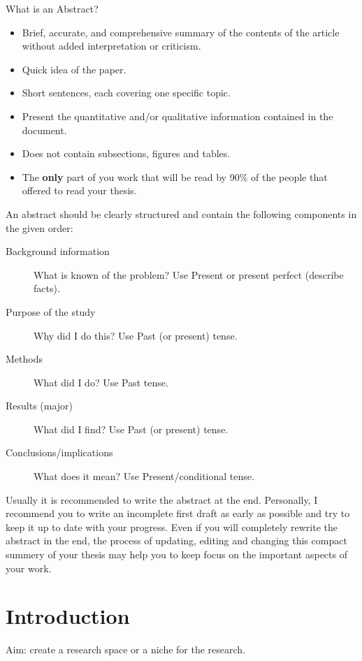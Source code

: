 What is an Abstract?
\begin{itemize}
	\item Brief, accurate, and comprehensive summary of the contents of the article without added interpretation or criticism.
	\item Quick idea of the paper.
	\item Short sentences, each covering one specific topic.
	\item Present the quantitative and/or qualitative information contained in the document.
	\item Does not contain subsections, figures and tables.
	\item The \textbf{only} part of you work that will be read by 90\% of the people that offered to read your thesis.
\end{itemize}

An abstract should be clearly structured and contain the following components in the given order:
\begin{description}
	\item[Background information] What is known of the problem? Use Present or present perfect (describe facts).
	\item[Purpose of the study] Why did I do this? Use Past (or present) tense.
	\item[Methods]  What did I do? Use Past tense.
	\item[Results (major)] What did I find? Use Past (or present) tense.
	\item[Conclusions/implications] What does it mean? Use Present/conditional tense.
\end{description}

Usually it is recommended to write the abstract at the end.
Personally, I recommend you to write an incomplete first draft as early as possible and try to keep it up to date with your progress.
Even if you will completely rewrite the abstract in the end, the process of updating, editing and changing this compact summery of your thesis may help you to keep focus on the important aspects of your work.

\section{Introduction}\label{AboutIntroduction}

Aim: create a research space or a niche for the research.

